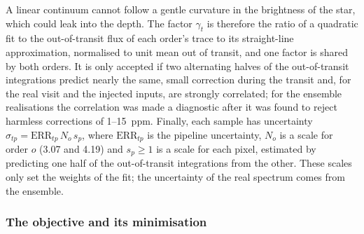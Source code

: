 A linear continuum cannot follow a gentle curvature in the brightness of the
star, which could leak into the depth. The factor $\gamma_t$ is therefore the
ratio of a quadratic fit to the out-of-transit flux of each order's trace to
its straight-line approximation, normalised to unit mean out of transit, and one
factor is shared by both orders. It is only accepted if two alternating halves
of the out-of-transit integrations predict nearly the same, small correction
during the transit and, for the real visit and the injected inputs, are
strongly correlated; for the ensemble realisations the correlation was made
a diagnostic after it was found to reject harmless corrections of
1--15~ppm. Finally, each
sample has uncertainty $\sigma_{tp}=\mathrm{ERR}_{tp}\,N_{o}\,s_{p}$, where
$\mathrm{ERR}_{tp}$ is the pipeline uncertainty, $N_o$ is a scale for order
$o$ (3.07 and 4.19) and $s_p\geq1$ is a scale for each pixel, estimated by
predicting one half of the out-of-transit integrations from the other. These
scales only set the weights of the fit; the uncertainty of the real spectrum
comes from the ensemble.

\subsubsection{The objective and its minimisation}

